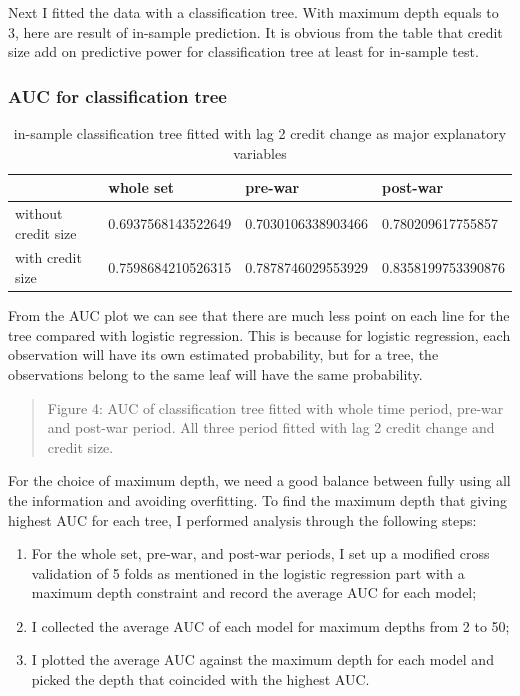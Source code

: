 \documentclass{article}
\newcommand{\ciapdf}[1]{\vspace*{-\parskip}\begin{center}\resizebox{0.75\textwidth}{!}{\texttt{[image: \#1]}}\end{center}}
\begin{document}
Next I fitted the data with a classification tree. With maximum depth
equals to 3, here are result of in-sample prediction. It is obvious from
the table that credit size add on predictive power for classification
tree at least for in-sample test.

\subsubsection*{\centering{}AUC for classification tree}

\begin{table}[H]
    \caption{
    in-sample classification tree fitted with lag 2 credit change
    as major explanatory variables
    }
    \begin{center}\begin{tabular}{|l|l|l|l|}
    \hline
                        & whole set          & pre-war            & post-war           \\ \hline
    without credit size & 0.6937568143522649 & 0.7030106338903466 & 0.780209617755857  \\ \hline
    with credit size    & 0.7598684210526315 & 0.7878746029553929 & 0.8358199753390876 \\ \hline
    \end{tabular}\end{center}
\end{table}

From the AUC plot we can see that there are much less point on each line
for the tree compared with logistic regression. This is because for
logistic regression, each observation will have its own estimated
probability, but for a tree, the observations belong to the same leaf
will have the same probability.

\ciapdf{Figure_5.pdf}
\begin{quote}
Figure 4: AUC of classification tree fitted with whole time period,
pre-war and post-war period. All three period fitted with lag 2 credit
change and credit size.
\end{quote}

For the choice of maximum depth, we need a good balance between fully using
all the information and avoiding overfitting. To find the maximum depth
that giving highest AUC for each tree, I performed analysis through the
following steps:

\begin{enumerate}
    \item For the whole set, pre-war, and post-war periods, I set up a
          modified cross validation of 5 folds as mentioned in the logistic
          regression part with a maximum depth constraint and record the
          average AUC for each model;
    \item I collected the average AUC of each model for maximum depths from 2 to 50;
    \item I plotted the average AUC against the maximum depth for each model and picked
          the depth that coincided with the highest AUC.
\end{enumerate}
\end{document}
